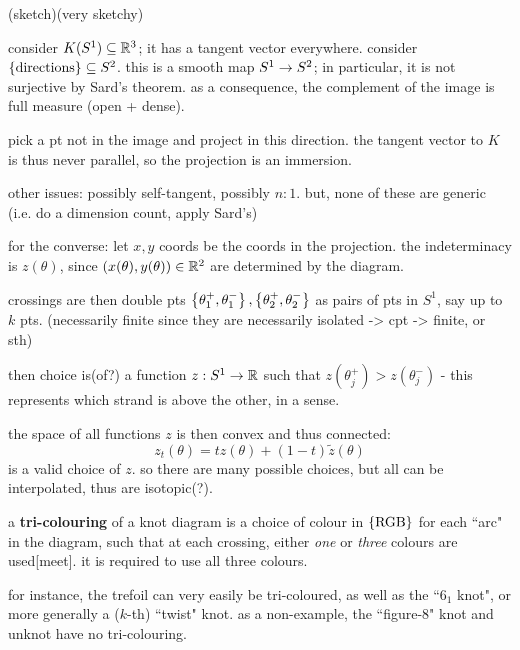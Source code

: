 \begin{pf}[source=Primary Source Material]
    (sketch)(very sketchy)

    consider $K(S^{1})\subseteq\mathbb{R}^{3}$; it has a tangent vector everywhere.
    consider $\left\{{\textrm{directions}}\right\}\subseteq S^{2}$.
    this is a smooth map $S^{1}\rightarrow S^{2}$; in particular, it is not surjective
    by Sard's theorem.
    as a consequence, the complement of the image is full measure (open + dense).

    pick a pt not in the image and project in this direction.
    the tangent vector to $K$ is thus never parallel, so the projection is an
    immersion.

    other issues: possibly self-tangent, possibly $n:1$.
    but, none of these are generic (i.e. do a dimension count, apply Sard's)

    for the converse:
    let $x,y$ coords be the coords in the projection.
    the indeterminacy is $z(\theta)$, since $(x(\theta),y(\theta))\in\mathbb{R}^{2}$
    are determined by the diagram.

    crossings are then double pts
    $\left\{{\theta_{1}^{+},\theta_{1}^{-}}\right\},\left\{{\theta_{2}^{+},\theta_{2}^{-}}\right\}$
    as pairs of pts in $S^{1}$, say up to $k$ pts.
    (necessarily finite since they are necessarily isolated -> cpt -> finite,
    or sth)

    then choice is(of?) a function $z:S^{1}\rightarrow\mathbb{R}$ such that
    $z(\theta_{j}^{+})>z(\theta_{j}^{-})$ - this represents which strand is above
    the other, in a sense.

    the space of all functions $z$ is then convex and thus connected:
    \begin{equation*}
        z_{t}(\theta)=tz(\theta)+(1-t)\tilde{z}(\theta)
    \end{equation*}
    is a valid choice of $z$.
    so there are many possible choices, but all can be interpolated, thus are
    isotopic(?).
\end{pf}

\begin{defn}
    a \textbf{tri-colouring} of a knot diagram is a choice of colour in
    $\left\{{\textrm{RGB}}\right\}$ for each ``arc" in the diagram, such that at each crossing,
    either \textit{one} or \textit{three} colours are used[meet].
    it is required to use all three colours.
\end{defn}

for instance, the trefoil can very easily be tri-coloured, as well as the
``$6_{1}$ knot", or more generally a ($k$-th) ``twist" knot.
as a non-example, the ``figure-8" knot and unknot have no tri-colouring.

